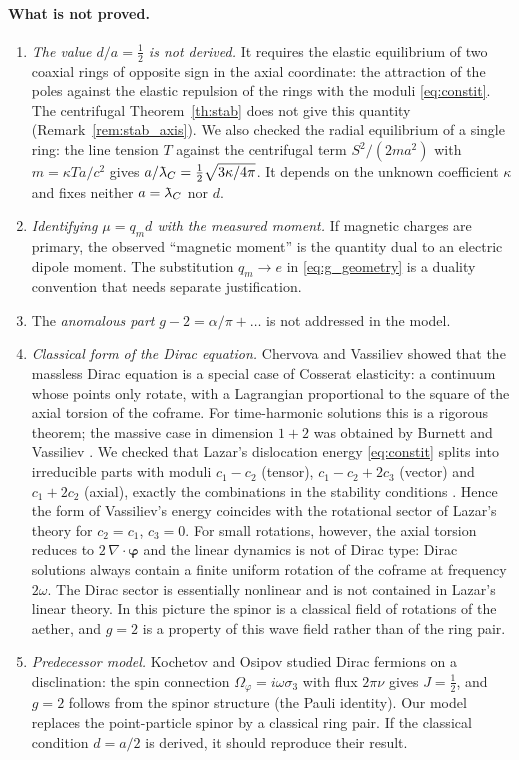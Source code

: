 \documentclass[12pt,a4paper]{article}
\providecommand{\lambdabar}{{\mkern0.75mu\mathchar'26\mkern-9.75mu\lambda}}
\begin{document}
\paragraph{What is not proved.}
\begin{enumerate}[nosep]
\item \emph{The value $d/a=\tfrac12$ is not derived.} It requires the elastic
equilibrium of two coaxial rings of opposite sign in the axial coordinate: the
attraction of the poles against the elastic repulsion of the rings with the moduli
\eqref{eq:constit}. The centrifugal Theorem~\ref{th:stab} does not give this quantity
(Remark~\ref{rem:stab_axis}). We also checked the radial equilibrium of a single
ring: the line tension $T$ against the centrifugal term $S^2/(2ma^2)$ with
$m=\kappa Ta/c^2$ gives $a/\lambdabar_C=\tfrac12\sqrt{3\kappa/4\pi}$. It depends on
the unknown coefficient $\kappa$ and fixes neither $a=\lambdabar_C$ nor $d$.
\item \emph{Identifying $\mu=q_md$ with the measured moment.} If magnetic charges
are primary, the observed ``magnetic moment'' is the quantity dual to an electric
dipole moment. The substitution $q_m\to e$ in \eqref{eq:g_geometry} is a duality
convention that needs separate justification.
\item The \emph{anomalous part} $g-2=\alpha/\pi+\dots$ is not addressed in the model.
\item \emph{Classical form of the Dirac equation.} Chervova and Vassiliev
\cite{vassiliev2009} showed that the massless Dirac equation is a special case of Cosserat
elasticity: a continuum whose points only rotate, with a Lagrangian proportional to the
square of the axial torsion of the coframe. For time-harmonic solutions this is a rigorous
theorem; the massive case in dimension $1+2$ was obtained by Burnett and Vassiliev
\cite{burnett2010}. We checked that Lazar's dislocation energy \eqref{eq:constit} splits into
irreducible parts with moduli $c_1-c_2$ (tensor), $c_1-c_2+2c_3$ (vector) and $c_1+2c_2$
(axial), exactly the combinations in the stability conditions \cite{lazar2010pla}. Hence
the form of Vassiliev's energy coincides with the rotational sector of Lazar's theory for
$c_2=c_1$, $c_3=0$. For small rotations, however, the axial torsion reduces to
$2\,\nabla\cdot\boldsymbol\varphi$ and the linear dynamics is not of Dirac type: Dirac solutions always
contain a finite uniform rotation of the coframe at frequency $2\omega$. The Dirac sector is
essentially nonlinear and is not contained in Lazar's linear theory. In this picture the spinor is a classical field of
rotations of the aether, and $g=2$ is a property of this wave field rather than of the ring
pair.
\item \emph{Predecessor model.} Kochetov and Osipov \cite{osipov2010} studied Dirac
fermions on a disclination: the spin connection $\Omega_\varphi=i\omega\sigma_3$ with
flux $2\pi\nu$ gives $J=\tfrac12$, and $g=2$ follows from the spinor structure (the
Pauli identity). Our model replaces the point-particle spinor by a classical ring
pair. If the classical condition $d=a/2$ is derived, it should reproduce their result.
\end{enumerate}
\end{document}
